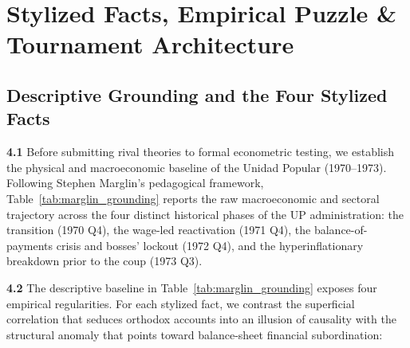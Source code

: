 \section{Stylized Facts, Empirical Puzzle \& Tournament Architecture}
\label{sec:empirical_strategy}

\subsection{Descriptive Grounding and the Four Stylized Facts}
\label{sec:stylized_facts}

\textbf{4.1} Before submitting rival theories to formal econometric testing, we establish the physical and macroeconomic baseline of the Unidad Popular (1970--1973). Following Stephen Marglin's pedagogical framework, Table~\ref{tab:marglin_grounding} reports the raw macroeconomic and sectoral trajectory across the four distinct historical phases of the UP administration: the transition (1970 Q4), the wage-led reactivation (1971 Q4), the balance-of-payments crisis and bosses' lockout (1972 Q4), and the hyperinflationary breakdown prior to the coup (1973 Q3).



\textbf{4.2} The descriptive baseline in Table~\ref{tab:marglin_grounding} exposes four empirical regularities. For each stylized fact, we contrast the superficial correlation that seduces orthodox accounts into an illusion of causality \citep{BlancoMatute2018} with the structural anomaly that points toward balance-sheet financial subordination:

